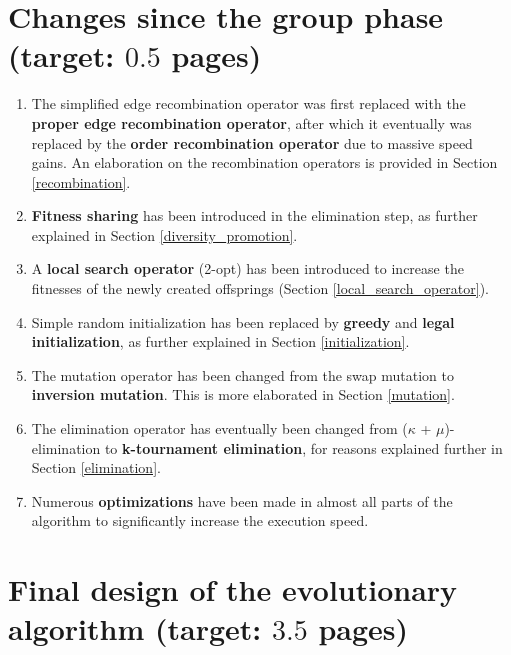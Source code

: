 \documentclass[a4paper,10pt]{article}
\begin{document}
\section{Changes since the group phase (target: $0.5$ pages)} 
\begin{enumerate}
\item The simplified edge recombination operator was first replaced with the \textbf{proper edge recombination operator}, after which it eventually was replaced by the \textbf{order recombination operator} due to massive speed gains. An elaboration on the recombination operators is provided in Section \ref{recombination}. 
\item \textbf{Fitness sharing} has been introduced in the elimination step, as further explained in Section \ref{diversity_promotion}.
\item A \textbf{local search operator} (2-opt) has been introduced to increase the fitnesses of the newly created offsprings (Section \ref{local_search_operator}).
\item Simple random initialization has been replaced by \textbf{greedy} and \textbf{legal initialization}, as further explained in Section \ref{initialization}.
\item The mutation operator has been changed from the swap mutation to \textbf{inversion mutation}. This is more elaborated in Section \ref{mutation}.
\item The elimination operator has eventually been changed from ($\kappa$ + $\mu$)-elimination to \textbf{k-tournament elimination}, for reasons explained further in Section \ref{elimination}.
\item Numerous \textbf{optimizations} have been made in almost all parts of the algorithm to significantly increase the execution speed.
\end{enumerate}

\section{Final design of the evolutionary algorithm (target: $3.5$ pages)} 
\end{document}
